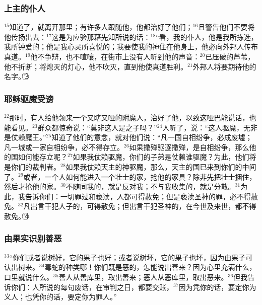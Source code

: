 \subsubsection{上主的仆人}
$^{15}$\UL[耶稣]知道了，就离开那里；有许多人跟随他，他都治好了他们；$^{16}$且警告他们不要将他传扬出去：$^{17}$这是为应验那藉\UL[依撒意亚]先知所说的话：$^{18}$“看，我的仆人，他是我所拣选，我所钟爱的；他是我心灵所喜悦的；我要使我的神住在他身上，他必向外邦人传布真道。$^{19}$他不争辩，也不喧嚷，在街市上没有人听到他的声音：$^{20}$已压破的芦苇，他不折断；将熄灭的灯心，他不吹灭，直到他使真道胜利。$^{21}$外邦人将要期待他的名字。”\textcircled{3}


\subsubsection{耶稣驱魔受谤}
$^{22}$那时，有人给他领来一个又瞎又哑的附魔人，\UL[耶稣]治好了他，以致这哑巴能说话，也能看见。$^{23}$群众都惊奇说：“莫非这人是\UL[达味]之子吗？”$^{24}$\UL[法利塞]人听了，说：“这人驱魔，无非是仗赖魔王\UL[贝耳则步]。”$^{25}$\UL[耶稣]知道了他们的意念，就对他们说：“凡一国自相纷争，必成废墟；凡一城或一家自相纷争，必不得存立。$^{26}$如果撒殚驱逐撒殚，是自相纷争，那么他的国如何能存立呢？$^{27}$如果我仗赖\UL[贝耳则步]驱魔，你们的子弟是仗赖谁驱魔？为此，他们将是你们的裁判者。$^{28}$如果我仗赖天主的神驱魔，那么，天主的国已来到你们的中间了。$^{29}$或者，一个人如何能进入一个壮士的家，抢他的家具？除非先把壮士捆住，然后才抢他的家。$^{30}$不随同我的，就是反对我；不与我收集的，就是分散。$^{31}$为此，我告诉你们：一切罪过和亵渎，人都可得赦免；但是亵渎圣神的罪，必不得赦免。$^{32}$凡出言干犯人子的，可得赦免；但出言干犯圣神的，在今世及来世，都不得赦免。”\textcircled{4}


\subsubsection{由果实识别善恶}
$^{33}$“你们或者说树好，它的果子也好；或者说树坏，它的果子也坏，因为由果子可认出树来。$^{34}$毒蛇的种类哪！你们既是恶的，怎能说出善来？因为心里充满什么，口里就说什么。$^{35}$善人从善库里，取出善来；恶人从恶库里，取出恶来。$^{36}$但我告诉你们：人所说的每句废话，在审判之日，都要交账，$^{37}$因为凭你的话，要定你为义人；也凭你的话，要定你为罪人。”


